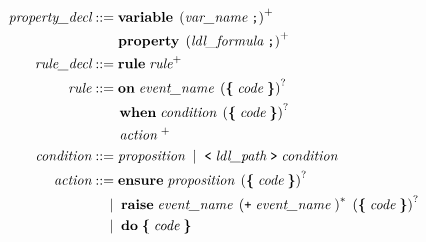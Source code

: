 \documentclass[preview=true]{standalone}
\begin{document}
\begin{table}[t]
\begin{align*}
  \textit{property\_decl} &::=
  \textbf{variable}\;
    \left( \textit{var\_name}\; \texttt{;} \right)^+
  \\&\hspace{1.9em}
  \textbf{property}\;
  \left(\textit{ldl\_formula}\; \texttt{;}\right)^+
  \\
  \textit{rule\_decl} &::= \textbf{rule}\;
  \textit{rule}^+
  \\
  \textit{rule} &::=
  \textbf{on}\; \textit{event\_name}\;
  \left( \textbf{\{}\; \textit{code}\; \textbf{\}} \right)^?
  \\&\qquad
  \textbf{when}\; \textit{condition}\;
  \left( \textbf{\{}\; \textit{code}\; \textbf{\}} \right)^?
  \\&\qquad
  \textit{action}\;^+
  \\
  \textit{condition} &::= \textit{proposition}\;
  \mid\;
  \texttt{<}\; \textit{ldl\_path}\; \texttt{>}\; \textit{condition}
  \\
  \textit{action} &::=
  \textbf{ensure}\; \textit{proposition}\;
  \left( \textbf{\{}\; \textit{code}\; \textbf{\}} \right)^?
  \\&\quad
  \mid\;
  \textbf{raise}\; \textit{event\_name}\; \left(\texttt{+}\; \textit{event\_name}\; \right)^\ast\;
  \left( \textbf{\{}\; \textit{code}\; \textbf{\}} \right)^?
  \\&\quad
  \mid\;
  \textbf{do}\;
    \textbf{\{}\; \textit{code}\; \textbf{\}}
\end{align*}
\end{table}
\smallskip
\end{document}
